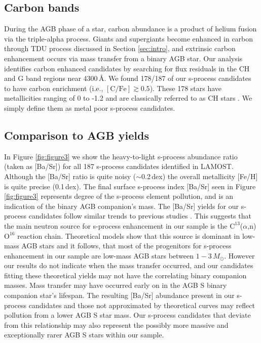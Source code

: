 \documentclass[a4paper,fleqn,usenatbib]{mnras}
\begin{document}
\subsection{Carbon bands}
During the AGB phase of a star, carbon abundance is a product of helium fusion via the triple-alpha process. Giants and supergiants become enhanced in carbon through TDU process discussed in Section \ref{sec:intro}, and extrinsic carbon enhancement occurs via mass transfer from a binary AGB star. Our analysis identifies carbon enhanced candidates by searching for flux residuals in the CH and G band regions near 4300\,\AA. We found 178/187 of our s-process candidates to have carbon enrichment (i.e., $[\textrm{C/Fe}] \gtrsim 0.5$). These 178 stars have metallicities ranging of 0 to -1.2 and are classically referred to as CH stars \citep[e.g.][]{luck1991, mcclure1997}. We simply define them as metal poor s-process candidates.

\subsection{Comparison to AGB yields}
In Figure \ref{fig:figure3} we show the heavy-to-light s-process abundance ratio (taken as [Ba/Sr]) for all 187 s-process candidates identified in LAMOST. Although the [Ba/Sr] ratio is quite noisy ($\sim$0.2\,dex) the overall metallicity [Fe/H] is quite precise (0.1\,dex). The final surface s-process index [Ba/Sr] seen in Figure \ref{fig:figure3} represents degree of the s-process element pollution, and is an indication of the binary AGB companion's mass. The [Ba/Sr] yields for our s-process candidates follow similar trends to previous studies \citep{fishlock2014,cristallo2015,karakas_lugaro2016}. This suggests that the main neutron source for s-process enhancement in our sample is the $\text{C}^{13}$(\textrm{$\alpha$},n)$\text{O}^{16}$ reaction chain. Theoretical models show that this source is dominant in low-mass AGB stars and it follows, that most of the progenitors for s-process enhancement in our sample are low-mass AGB stars between $1 - 3\,M_{\odot}$. However our results do not indicate when the mass transfer occurred, and our candidates fitting these theoretical yields may not have the correlating binary companion masses. Mass transfer may have occurred early on in the AGB S binary companion star's lifespan. The resulting [Ba/Sr] abundance present in our s-process candidates and those not approximated by theoretical curves may reflect pollution from a lower AGB S star mass. Our s-process candidates that deviate from this relationship may also represent the possibly more massive and exceptionally rarer AGB S stars within our sample.
\end{document}
